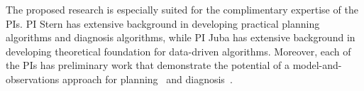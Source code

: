 The proposed research is especially suited for the complimentary expertise of the PIs. %
PI Stern has extensive background in developing practical planning algorithms and diagnosis algorithms, while PI Juba has extensive background in developing theoretical foundation for data-driven algorithms. 
Moreover, each of the PIs has preliminary work that demonstrate the potential of a model-and-observations approach for planning~\cite{stern2011probably,stern2012exploring,juba2016jmlr} and diagnosis~\cite{elmishali2016dataAugmented, juba2016aaai}.
